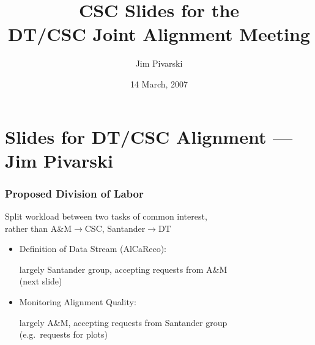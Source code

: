 \documentclass[compress]{beamer}
\title{CSC Slides for the \\ DT/CSC Joint Alignment Meeting}
\author{Jim Pivarski}
\institute{Texas A\&M University}
\date{14 March, 2007}
\begin{document}
\frame{\titlepage}
\section*{Slides for DT/CSC Alignment --- Jim Pivarski}

\begin{frame}
\frametitle{Proposed Division of Labor}

Split workload between two tasks of common interest, \\ rather than A\&M$\to$CSC, Santander$\to$DT

\vfill
\begin{itemize}\setlength{\itemsep}{0.75 cm}
\item Definition of Data Stream (AlCaReco):

\vspace{0.25 cm}
largely Santander group, accepting requests from A\&M \\ (next slide)
\item Monitoring Alignment Quality:

\vspace{0.25 cm}
largely A\&M, accepting requests from Santander group \\ (e.g.\ requests for plots)
\end{itemize}
\end{frame}
\end{document}

